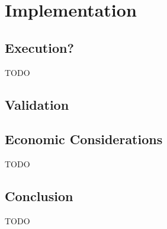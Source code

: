 \chapter{Implementation}
\label{chap:impl}

\section{Execution?}

TODO

\section{Validation}

\section{Economic Considerations}

TODO

\section{Conclusion}

TODO